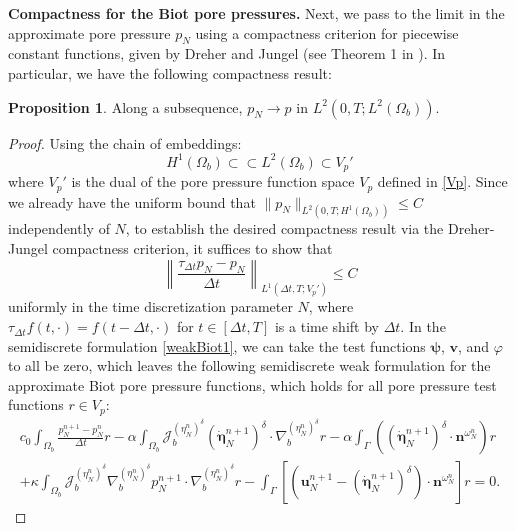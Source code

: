 \documentclass[11pt]{article}
\newcommand{\bd}{\boldsymbol}
\theoremstyle{definition}
\newtheorem{proposition}{Proposition}[section]
\begin{document}
\medskip

\noindent \textbf{Compactness for the Biot pore pressures.} Next, we pass to the limit in the approximate pore pressure $p_{N}$ using a compactness criterion for piecewise constant functions, given by Dreher and Jungel (see Theorem 1 in \cite{DreherJungel}). In particular, we have the following compactness result:

\begin{proposition}
Along a subsequence, $p_{N} \to p$ in $L^{2}(0, T; L^{2}(\Omega_{b}))$. 
\end{proposition}

\begin{proof}
Using the chain of embeddings:
\begin{equation*}
H^{1}(\Omega_{b}) \subset \subset L^{2}(\Omega_{b}) \subset V_{p}'
\end{equation*}
where $V_{p}'$ is the dual of the pore pressure function space $V_{p}$ defined in \eqref{Vp}. Since we already have the uniform bound that $\|p_{N}\|_{L^{2}(0, T; H^{1}(\Omega_{b}))} \le C$ independently of $N$, to establish the desired compactness result via the Dreher-Jungel compactness criterion, it suffices to show that
\begin{equation*}
\left\|\frac{\tau_{\Delta t} p_{N} - p_{N}}{\Delta t}\right\|_{L^{1}(\Delta t, T; V_{p}')} \le C
\end{equation*}
uniformly in the time discretization parameter $N$, where $\tau_{\Delta t}f(t, \cdot) = f(t - \Delta t, \cdot)$ for $t \in [\Delta t, T]$ is a time shift by $\Delta t$. In the semidiscrete formulation \eqref{weakBiot1}, we can take the test functions $\bd{\psi}$, $\bd{v}$, and $\varphi$ to all be zero, which leaves the following semidiscrete weak formulation for the approximate Biot pore pressure functions, which holds for all pore pressure test functions $r \in V_{p}$:
\begin{multline*}
c_{0} \int_{\Omega_{b}} \frac{p^{n + 1}_{N} - p^{n}_{N}}{\Delta t} r - \alpha \int_{\Omega_{b}} \mathcal{J}^{(\eta^{n}_{N})^{\delta}}_{b} (\dot{\bd{\eta}}^{n + 1}_{N})^{\delta} \cdot \nabla^{(\eta^{n}_{N})^{\delta}}_{b} r - \alpha \int_{\Gamma} \left(\left(\dot{\bd{\eta}}^{n + 1}_{N}\right)^{\delta} \cdot \bd{n}^{\omega^{n}_{N}}\right) r \\
+ \kappa \int_{\Omega_{b}} \mathcal{J}^{(\eta^{n}_{N})^{\delta}}_{b} \nabla^{(\eta^{n}_{N})^{\delta}}_{b} p^{n + 1}_{N} \cdot \nabla^{(\eta^{n}_{N})^{\delta}}_{b} r - \int_{\Gamma} \left[\left(\bd{u}^{n + 1}_{N} - (\dot{\bd{\eta}}^{n + 1}_{N})^{\delta}\right) \cdot \bd{n}^{\omega^{n}_{N}}\right] r = 0.

\end{multline*}
\end{proof}
\end{document}
